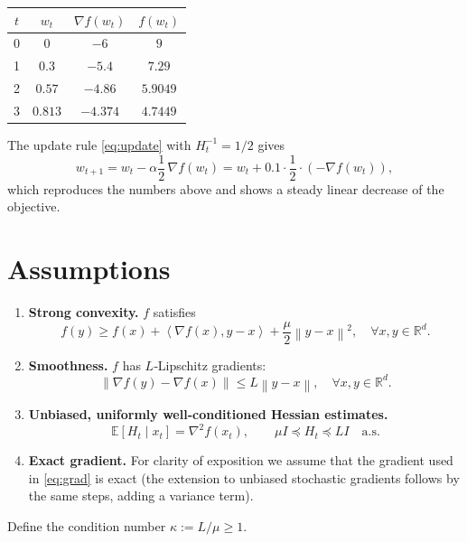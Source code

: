 \documentclass{article}
\newcommand{\E}{\mathbb{E}}
\newcommand{\R}{\mathbb{R}}
\newcommand{\norm}[1]{\left\lVert #1\right\rVert}
\newcommand{\ip}[2]{\left\langle #1,#2\right\rangle}
\begin{document}
\begin{center}
\begin{tabular}{c|c|c|c}
$t$ & $w_t$ & $\nabla f(w_t)$ & $f(w_t)$\\ \hline
0 & $0$ & $-6$ & $9$\\
1 & $0.3$ & $-5.4$ & $7.29$\\
2 & $0.57$ & $-4.86$ & $5.9049$\\
3 & $0.813$ & $-4.374$ & $4.7449$
\end{tabular}
\end{center}
The update rule \eqref{eq:update} with $H_t^{-1}=1/2$ gives
\[
   w_{t+1}=w_t-\alpha\frac{1}{2}\,\nabla f(w_t)
          =w_t+0.1\cdot\frac{1}{2}\cdot(-\nabla f(w_t)),
\]
which reproduces the numbers above and shows a steady linear decrease of the
objective.

\newpage
\section*{Assumptions}
\begin{enumerate}[label=(A\arabic*)]
\item \textbf{Strong convexity.} $f$ satisfies
\[
   f(y)\ge f(x)+\ip{\nabla f(x)}{y-x}+\frac{\mu}{2}\norm{y-x}^{2},
   \quad\forall x,y\in\R^{d}. \tag{A1}
\]
\item \textbf{Smoothness.} $f$ has $L$‑Lipschitz gradients:
\[
   \norm{\nabla f(y)-\nabla f(x)}\le L\norm{y-x},
   \quad\forall x,y\in\R^{d}. \tag{A2}
\]
\item \textbf{Unbiased, uniformly well‑conditioned Hessian estimates.}
\[
   \E\!\left[H_t\mid x_t\right]=\nabla^{2}f(x_t),\qquad
   \mu I\preceq H_t\preceq L I\quad\text{a.s.} \tag{A3}
\]
\item \textbf{Exact gradient.} For clarity of exposition we assume that the
gradient used in \eqref{eq:grad} is exact (the extension to unbiased stochastic
gradients follows by the same steps, adding a variance term).
\end{enumerate}

Define the condition number $\kappa:=L/\mu\ge1$.
\end{document}
